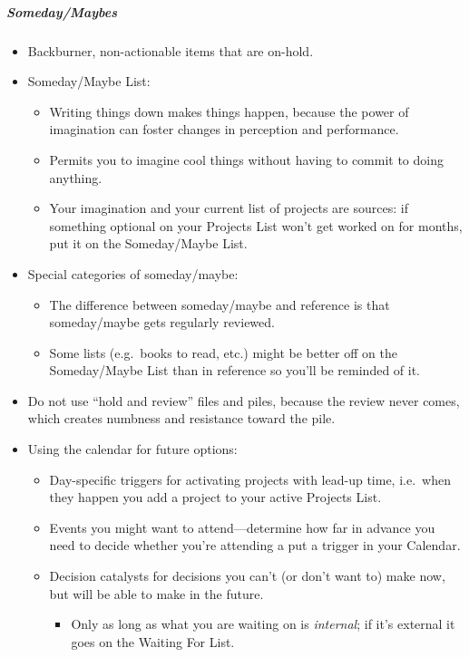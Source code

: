 \documentclass{article}
\begin{document}
\subparagraph{Someday/Maybes}

\begin{itemize}
  \item Backburner, non-actionable items that are on-hold.
  \item Someday/Maybe List:
  \begin{itemize}
    \item Writing things down makes things happen, because the power of imagination can foster changes in perception and performance.
    \item Permits you to imagine cool things without having to commit to doing anything.
    \item Your imagination and your current list of projects are sour\-ces: if something optional on your Projects List won't get worked on for months, put it on the Someday/Maybe List.
  \end{itemize}
  \item Special categories of someday/maybe:
  \begin{itemize}
    \item The difference between someday/maybe and reference is that someday/maybe gets regularly reviewed.
    \item Some lists (e.g.\ books to read, etc.) might be better off on the Someday/Maybe List than in reference so you'll be reminded of it.
  \end{itemize}
  \item Do not use ``hold and review'' files and piles, because the review never comes, which creates numbness and resistance toward the pile.
  \item Using the calendar for future options:
  \begin{itemize}
    \item Day-specific triggers for activating projects with lead-up time, i.e.\ when they happen you add a project to your active Projects List.
    \item Events you might want to attend---determine how far in advance you need to decide whether you're attending a put a trigger in your Calendar.
    \item Decision catalysts for decisions you can't (or don't want to) make now, but will be able to make in the future.
    \begin{itemize}
      \item Only as long as what you are waiting on is \emph{internal}; if it's external it goes on the Waiting For List.

\end{itemize}
\end{itemize}
\end{itemize}
\end{document}
